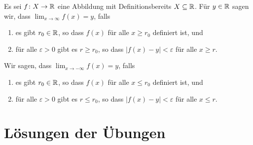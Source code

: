 \documentclass[a4paper,10pt]{article}
\begin{document}
\begin{defi}
 Es sei $f \colon X \to \mathbb{R}$ eine Abbildung mit Definitionsbereits $X \subseteq \mathbb{R}$. Für $y \in \mathbb{R}$ sagen wir, dass $\lim_{x \to \infty} f(x) = y$, falls
 \begin{enumerate}
  \item
   es gibt $r_0 \in \mathbb{R}$, so dass $f(x)$ für alle $x \geq r_0$ definiert ist, und
  \item
   für alle $\varepsilon > 0$ gibt es $r \geq r_0$, so dass $|f(x) - y| < \varepsilon$ für alle $x \geq r$.
 \end{enumerate}
 Wir sagen, dass $\lim_{x \to -\infty} f(x) = y$, falls
 \begin{enumerate}
  \item
   es gibt $r_0 \in \mathbb{R}$, so dass $f(x)$ für alle $x \leq r_0$ definiert ist, und
  \item
   für alle $\varepsilon > 0$ gibt es $r \leq r_0$, so dass $|f(x) - y| < \varepsilon$ für alle $x \leq r$.
 \end{enumerate}
\end{defi}









\newpage


\section{Lösungen der Übungen}


\printsolutions
\end{document}
